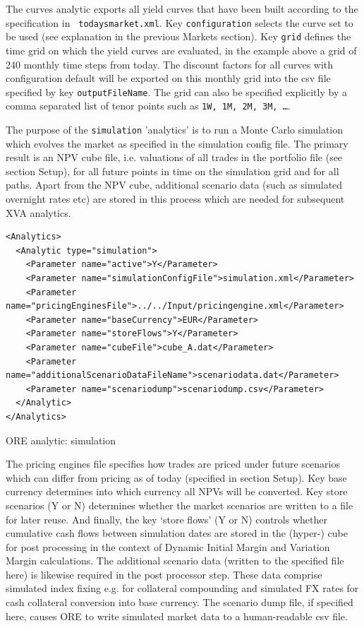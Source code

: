\documentclass[12pt, a4paper]{article}
\begin{document}
The curves analytic exports all yield curves that have been built according to the specification in {\tt
  todaysmarket.xml}. Key {\tt configuration} selects the curve set to be used (see explanation in the previous Markets
section).  Key {\tt grid} defines the time grid on which the yield curves are evaluated, in the example above a grid of
240 monthly time steps from today. The discount factors for all curves with configuration default will be exported on
this monthly grid into the csv file specified by key {\tt outputFileName}. The grid can also be specified explicitly by
a comma separated list of tenor points such as {\tt 1W, 1M, 2M, 3M, \dots}.

\medskip The purpose of the {\tt simulation} 'analytics' is to run a Monte Carlo simulation which evolves the market as
specified in the simulation config file. The primary result is an NPV cube file, i.e. valuations of all trades in the
portfolio file (see section Setup), for all future points in time on the simulation grid and for all paths. Apart from
the NPV cube, additional scenario data (such as simulated overnight rates etc) are stored in this process which are
needed for subsequent XVA analytics.

\begin{listing}[H]
\begin{verbatim}
<Analytics>
  <Analytic type="simulation">
    <Parameter name="active">Y</Parameter>
    <Parameter name="simulationConfigFile">simulation.xml</Parameter>
    <Parameter name="pricingEnginesFile">../../Input/pricingengine.xml</Parameter>
    <Parameter name="baseCurrency">EUR</Parameter>
    <Parameter name="storeFlows">Y</Parameter>
    <Parameter name="cubeFile">cube_A.dat</Parameter>
    <Parameter name="additionalScenarioDataFileName">scenariodata.dat</Parameter>
    <Parameter name="scenariodump">scenariodump.csv</Parameter>
  </Analytic>
</Analytics>      
\end{verbatim}
\caption{ORE analytic: simulation}
\label{lst:ore_simulation}
\end{listing}

The pricing engines file specifies how trades are priced under future scenarios which can differ from pricing as of
today (specified in section Setup).  Key base currency determines into which currency all NPVs will be converted. Key
store scenarios (Y or N) determines whether the market scenarios are written to a file for later reuse. And finally, the
key `store flows' (Y or N) controls whether cumulative cash flows between simulation dates are stored in the (hyper-)
cube for post processing in the context of Dynamic Initial Margin and Variation Margin calculations. The additional
scenario data (written to the specified file here) is likewise required in the post processor step. These data comprise
simulated index fixing e.g. for collateral compounding and simulated FX rates for cash collateral conversion into base
currency. The scenario dump file, if specified here, causes ORE to write simulated market data to a human-readable csv
file.
 
\end{document}
